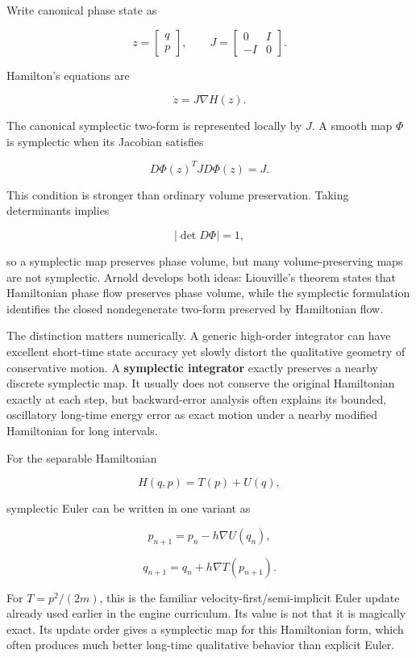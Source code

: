 Write canonical phase state as

\[
z=
\begin{bmatrix}
q\\p
\end{bmatrix},
\qquad
J=
\begin{bmatrix}
0&I\\
-I&0
\end{bmatrix}.
\]

Hamilton's equations are

\[
\dot z
=
J\nabla H(z).
\]

The canonical symplectic two-form is represented locally by \(J\). A smooth map \(\Phi\) is symplectic when its Jacobian satisfies

\[
D\Phi(z)^T J D\Phi(z)=J.
\]

This condition is stronger than ordinary volume preservation. Taking determinants implies

\[
|\det D\Phi|=1,
\]

so a symplectic map preserves phase volume, but many volume-preserving maps are not symplectic. Arnold develops both ideas: Liouville's theorem states that Hamiltonian phase flow preserves phase volume, while the symplectic formulation identifies the closed nondegenerate two-form preserved by Hamiltonian flow.

The distinction matters numerically. A generic high-order integrator can have excellent short-time state accuracy yet slowly distort the qualitative geometry of conservative motion. A \textbf{symplectic integrator} exactly preserves a nearby discrete symplectic map. It usually does not conserve the original Hamiltonian exactly at each step, but backward-error analysis often explains its bounded, oscillatory long-time energy error as exact motion under a nearby modified Hamiltonian for long intervals.

For the separable Hamiltonian

\[
H(q,p)=T(p)+U(q),
\]

symplectic Euler can be written in one variant as

\[
p_{n+1}
=
p_n-h\nabla U(q_n),
\]

\[
q_{n+1}
=
q_n+h\nabla T(p_{n+1}).
\]

For \(T=p^2/(2m)\), this is the familiar velocity-first/semi-implicit Euler update already used earlier in the engine curriculum. Its value is not that it is magically exact. Its update order gives a symplectic map for this Hamiltonian form, which often produces much better long-time qualitative behavior than explicit Euler.

